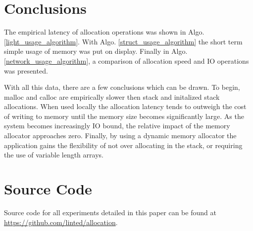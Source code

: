 \documentclass[letterpaper, 10 pt, conference]{ieeeconf}  %
\newcommand*\GitHubLoc{https://github.com/linted/allocation}
\begin{document}


\section{Conclusions}
The empirical latency of allocation operations was shown in Algo. \ref{light_usage_algorithm}.
With Algo. \ref{struct_usage_algorithm} the short term simple usage of memory was put on display.
Finally in Algo. \ref{network_usage_algorithm}, a comparison of allocation speed and IO operations was presented.

With all this data, there are a few conclusions which can be drawn.
To begin, malloc and calloc are empirically slower then stack and initalized stack allocations.
When used locally the allocation latency tends to outweigh the cost of writing to memory until the memory size becomes significantly large.
As the system becomes increasingly IO bound, the relative impact of the memory allocator approaches zero.
Finally, by using a dynamic memory allocator the application gains the flexibility of not over allocating in the stack, or requiring the use of variable length arrays.

\section{Source Code}

Source code for all experiments detailed in this paper can be found at \url{\GitHubLoc}.





\clearpage
\end{document}
